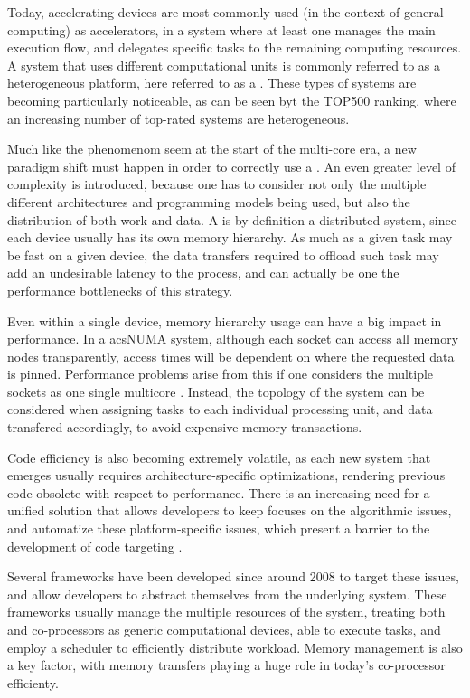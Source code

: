 \documentclass[main.tex]{subfiles}
\begin{document}
Today, accelerating devices are most commonly used (in the context of general-computing) as accelerators, in a system where at least one \cpu manages the main execution flow, and delegates specific tasks to the remaining computing resources. A system that uses different computational units is commonly referred to as a heterogeneous platform, here referred to as a \hetplat. These types of systems are becoming particularly noticeable, as can be seen byt the TOP500 ranking, where an increasing number of top-rated systems are heterogeneous.

Much like the phenomenom seem at the start of the multi-core era, a new paradigm shift must happen in order to correctly use a \hetplat. An even greater level of complexity is introduced, because one has to consider not only the multiple different architectures and programming models being used, but also the distribution of both work and data. A \hetplat is by definition a distributed system, since each device usually has its own memory hierarchy. As much as a given task may be fast on a given device, the data transfers required to offload such task may add an undesirable latency to the process, and can actually be one the performance bottlenecks of this strategy.

Even within a single device, memory hierarchy usage can have a big impact in performance. In a acs{NUMA} system, although each socket can access all memory nodes transparently, access times will be dependent on where the requested data is pinned. Performance problems arise from this if one considers the multiple sockets as one single multicore \cpu. Instead, the topology of the system can be considered when assigning tasks to each individual processing unit, and data transfered accordingly, to avoid expensive memory transactions.

Code efficiency is also becoming extremely volatile, as each new system that emerges usually requires architecture-specific optimizations, rendering previous code obsolete with respect to performance. There is an increasing need for a unified solution that allows developers to keep focuses on the algorithmic issues, and automatize these platform-specific issues, which present a barrier to the development of code targeting \hetplats.

Several frameworks have been developed since around 2008 to target these issues, and allow developers to abstract themselves from the underlying system. These frameworks usually manage the multiple resources of the system, treating both \cpus and co-processors as generic computational devices, able to execute tasks, and employ a scheduler to efficiently distribute workload. Memory management is also a key factor, with memory transfers playing a huge role in today's co-processor efficienty.
\end{document}
